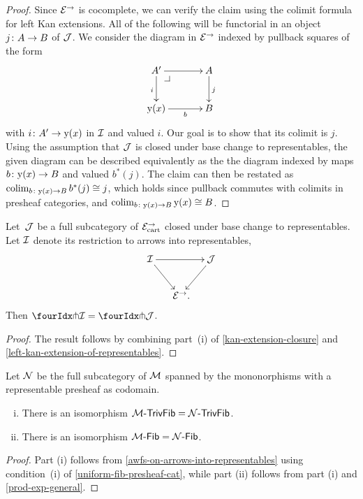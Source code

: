 \documentclass[reqno,10pt,a4paper,oneside,draft]{amsart}
\begin{document}
\begin{proof}
Since $\catE^\to$ is cocomplete, we can verify the claim using the colimit formula for left Kan extensions.
All of the following will be functorial in an object $j \co A \to B$ of $\cal{J}$.
We consider the diagram in $\catE^\to$ indexed by pullback squares of the form
\[
\xymatrix@C=1.2cm{
  A'
  \ar[r]
  \ar[d]_{i}
  \pullback{dr}
&
  A
  \ar[d]^{j}
\\
  \yon(x)
  \ar[r]_-{b}
&
  B
}
\]
with $i \co A' \to \yon(x)$ in $\cal{I}$ and valued $i$.
Our goal is to show that its colimit is $j$.
Using the assumption that $\cal{J}$ is closed under base change to representables, the given diagram can be described equivalently as the the diagram indexed by maps $b \co \yon(x) \to B$ and valued $b^*(j)$.
The claim can then be restated as $\colim_{b \co \yon(x) \to B} b^*(j) \iso j$, which holds since pullback commutes with colimits in presheaf categories, and $\colim_{b \co \yon(x) \to B} \yon(x) \iso B$.
\end{proof}

\begin{proposition} \label{awfs-on-arrows-into-representables}
Let~$\cal{J}$ be a full subcategory of $\catE_{\cart}^\to$ closed under base change to representables.
Let $\cal{I}$ denote its restriction to arrows into representables,
\[
\xymatrix@C-1em{
  \cal{I}
  \ar[rr]
  \ar[dr]
&&
  \cal{J}
  \ar[dl]
\\&
  \catE^\to
\rlap{.}}
\]
Then $\liftr{\cal{I}} = \liftr{\cal{J}}$.
\end{proposition}

\begin{proof}
The result follows by combining part~(i) of \cref{kan-extension-closure} and \cref{left-kan-extension-of-representables}.
\end{proof}

\begin{theorem} \label{small-gen-triv-kan}
Let $\cal{N}$ be the full subcategory of $\cal{M}$ spanned by the mononorphisms with a representable presheaf as codomain.
\begin{enumerate}[(i)]
\item There is an isomorphism $\TrivFib{\cal{M}} = \TrivFib{\cal{N}}$.
\item There is an isomorphism $\Fib{\cal{M}} = \Fib{\cal{N}}$.
\end{enumerate}
\end{theorem}

\begin{proof}
Part (i) follows from \cref{awfs-on-arrows-into-representables} using condition~(i) of \cref{uniform-fib-presheaf-cat}, while part (ii) follows from part (i) and \cref{prod-exp-general}.
\end{proof}
\end{document}
